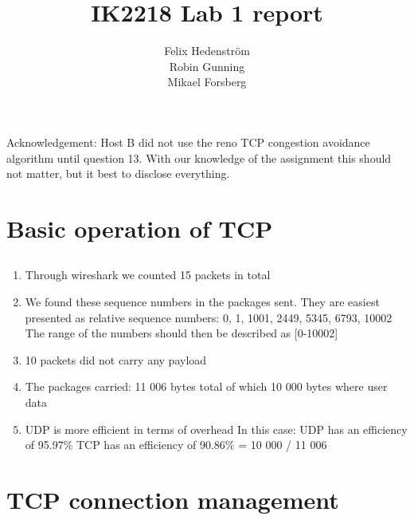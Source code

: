 \documentclass[a4paper]{article}
\begin{document}
\title{IK2218 Lab 1 report}
\author{Felix Hedenström\\Robin Gunning\\Mikael Forsberg}
\maketitle

\tableofcontents
\newpage
Acknowledgement: Host B did not use the reno TCP congestion avoidance algorithm until question 13. With our knowledge of the assignment this should not matter, but it best to disclose everything.
\setcounter{section}{9}
\section{Basic operation of TCP}
\setcounter{subsection}{6}
\subsection{}
\begin{enumerate}[label=\alph*)]
\item Through wireshark we counted 15 packets in total
\item We found these sequence numbers in the packages sent. They are easiest presented as relative sequence numbers:
0, 1, 1001, 2449, 5345, 6793, 10002
\newline
\newline
The range of the numbers should then be described as [0-10002]

\item 10 packets did not carry any payload
\item The packages carried: 11 006 bytes total of which 10 000 bytes where user data

\item UDP is more efficient in terms of overhead
\newline
\newline
In this case:
\newline
	UDP has an efficiency of 95.97\%
    \newline
	TCP has an efficiency of 90.86\% = 10 000 / 11 006

\end{enumerate}
\section{TCP connection management}
\setcounter{subsection}{1}
\setcounter{subsubsection}{5}
\end{document}
